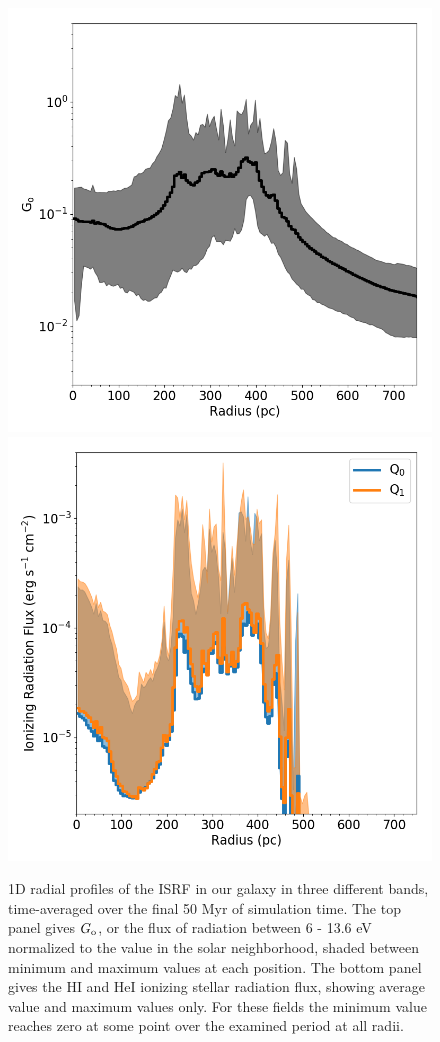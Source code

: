 \documentclass[twocolumn]{aastex61}
\begin{document}
\begin{figure}
\includegraphics[width=0.95\linewidth]{G_o_profile} \\
\includegraphics[width=0.95\linewidth]{ionizing_photon_profile}
\caption{1D radial profiles of the ISRF in our galaxy in three different bands, time-averaged over the final 50 Myr of simulation time. The top panel gives $G_{\rm o}$, or the flux of radiation between 6 - 13.6 eV normalized to the value in the solar neighborhood, shaded between minimum and maximum values at each position. The bottom panel gives the HI and HeI ionizing stellar radiation flux, showing average value and maximum values only. For these fields the minimum value reaches zero at some point over the examined period at all radii.}
\label{fig:ISRF}
\end{figure}
\end{document}

